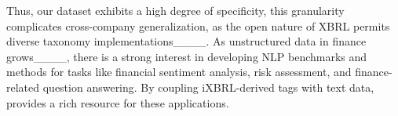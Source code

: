 Thus, our dataset exhibits a high degree of specificity, this granularity complicates cross-company generalization, as the open nature of XBRL permits diverse taxonomy implementations____.
As unstructured data in finance grows____, there is a strong interest in developing NLP benchmarks and methods for tasks like financial sentiment analysis, risk assessment, and finance-related question answering. 
By coupling iXBRL-derived tags with text data, \hifi{} provides a rich resource for these applications.